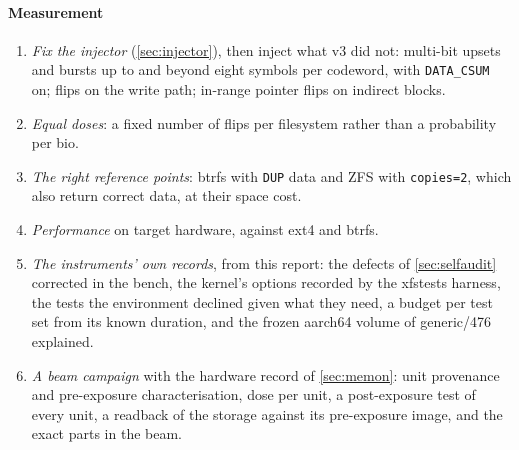 \paragraph*{Measurement}
\begin{enumerate}
\item \emph{Fix the injector} (\cref{sec:injector}), then inject what v3
  did not: multi-bit upsets and bursts up to and beyond eight symbols
  per codeword, with \texttt{DATA\_CSUM} on; flips on the write path;
  in-range pointer flips on indirect blocks.
\item \emph{Equal doses}: a fixed number of flips per filesystem rather
  than a probability per bio.
\item \emph{The right reference points}: btrfs with \texttt{DUP} data
  and ZFS with \texttt{copies=2}, which also return correct data, at
  their space cost.
\item \emph{Performance} on target hardware, against ext4 and btrfs.
\item \emph{The instruments' own records}, from this report: the defects
  of \cref{sec:selfaudit} corrected in the bench, the kernel's \bfs
  options recorded by the xfstests harness, the tests the environment
  declined given what they need, a budget per test set from its known
  duration, and the frozen aarch64 volume of generic/476 explained.
\item \emph{A beam campaign} with the hardware record of
  \cref{sec:memon}: unit provenance and pre-exposure characterisation,
  dose per unit, a post-exposure test of every unit, a readback of the
  storage against its pre-exposure image, and the exact parts in the
  beam.
\end{enumerate}
